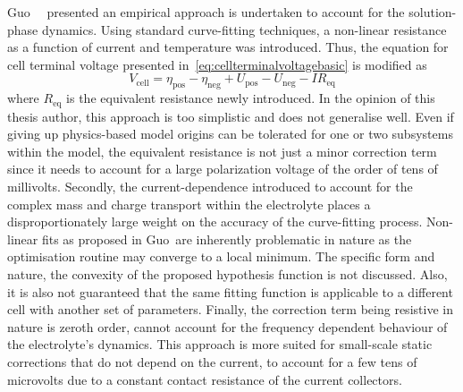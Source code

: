 Guo~\etal~\cite{Guo2011}  presented  an  empirical  approach  is  undertaken  to
account   for  the   solution-phase  dynamics.   Using  standard   curve-fitting
techniques, a  non-linear resistance  as a function  of current  and temperature
was  introduced.  Thus,  the  equation   for  cell  terminal  voltage  presented
in~\cref{eq:cellterminalvoltagebasic} is modified as
\begin{equation}
    V_\text{cell} = η_\text{pos} - η_\text{neg} + U_\text{pos} - U_\text{neg} - I R_\text{eq}
\end{equation}
where  $R_\text{eq}$  is the  equivalent  resistance  newly introduced.  In  the
opinion of  this thesis  author, this  approach is too  simplistic and  does not
generalise well. Even if giving up  physics-based model origins can be tolerated
for one  or two subsystems  within the model,  the equivalent resistance  is not
just a minor correction term since it  needs to account for a large polarization
voltage of  the order  of tens of  millivolts. Secondly,  the current-dependence
introduced  to account  for the  complex mass  and charge  transport within  the
electrolyte  places a  disproportionately large  weight on  the accuracy  of the
curve-fitting process. Non-linear  fits as proposed in  Guo~\etal are inherently
problematic  in nature  as  the optimisation  routine may  converge  to a  local
minimum.  The specific  form and  nature, \eg{}  the convexity  of the  proposed
hypothesis function is  not discussed. Also, it is also  not guaranteed that the
same fitting  function is  applicable to  a different cell  with another  set of
parameters. Finally,  the correction  term being resistive  in nature  is zeroth
order,  \ie{}  cannot account  for  the  frequency  dependent behaviour  of  the
electrolyte's  dynamics. This  approach is  more suited  for small-scale  static
corrections that do not depend on the current,\eg{} to account for a few tens of
microvolts  due to  a constant  contact  resistance of  the current  collectors.

